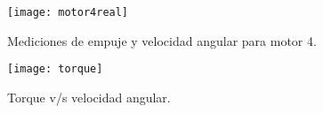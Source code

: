 \documentclass[../main.tex]{subfiles}
\begin{document}
\begin{figure}
\begin{centering}
\texttt{[image: motor4real]}
\par\end{centering}
\caption{Mediciones de empuje y velocidad angular para motor 4.}
\end{figure}

\begin{figure}
\begin{centering}
\texttt{[image: torque]}
\par\end{centering}
\caption{Torque v/s velocidad angular.}
\end{figure}
\end{document}
